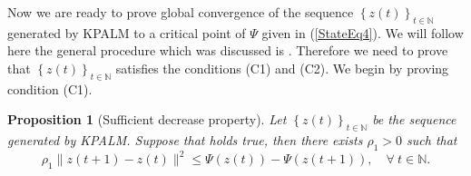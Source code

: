 \documentclass[12pt]{article}
\numberwithin{equation}{section}
\newtheorem{proposition}{Proposition}[section]
\newcommand{\nn}{\mathbb{N}} %
\begin{document}
Now we are ready to prove global convergence of the sequence $\left\lbrace z(t)\right\rbrace_{t \in \nn}$ generated by KPALM to a critical point of $\Psi$ given in (\ref{StateEq4}). We will follow here the general procedure which was discussed is . Therefore we need to prove that $\left\lbrace z(t)\right\rbrace_{t \in \nn}$ satisfies the conditions (C1) and (C2). We begin by proving condition (C1).

\begin{proposition}[Sufficient decrease property] \label{State_KPALM_SDP}
Let $\left\lbrace z(t) \right\rbrace_{t \in \nn}$ be the sequence generated by KPALM. Suppose that  holds true, then there exists $\rho_1 > 0$ such that 
\begin{equation*}
	\rho_1 \|z(t+1) - z(t)\|^2 \leq \Psi(z(t)) - \Psi(z(t+1)), \quad \forall \: t \in \mathbb{N} .
\end{equation*}
\end{proposition}
\end{document}
